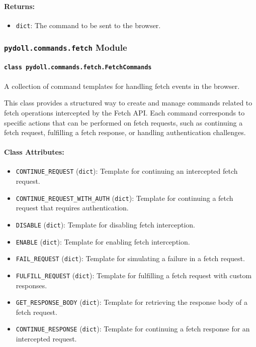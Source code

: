\documentclass{article}
\begin{document}
\paragraph{Returns:}
\begin{itemize}
    \item \texttt{dict}: The command to be sent to the browser.
\end{itemize}

\subsubsection*{\texttt{pydoll.commands.fetch} Module}

\paragraph*{\texttt{class pydoll.commands.fetch.FetchCommands}}
\noindent A collection of command templates for handling fetch events in the browser.

\noindent This class provides a structured way to create and manage commands related to fetch operations intercepted by the Fetch API\@. Each command corresponds to specific actions that can be performed on fetch requests, such as continuing a fetch request, fulfilling a fetch response, or handling authentication challenges.

\paragraph{Class Attributes:}
\begin{itemize}
    \item \texttt{CONTINUE\_REQUEST} (\texttt{dict}): Template for continuing an intercepted fetch request.
    \item \texttt{CONTINUE\_REQUEST\_WITH\_AUTH} (\texttt{dict}): Template for continuing a fetch request that requires authentication.
    \item \texttt{DISABLE} (\texttt{dict}): Template for disabling fetch interception.
    \item \texttt{ENABLE} (\texttt{dict}): Template for enabling fetch interception.
    \item \texttt{FAIL\_REQUEST} (\texttt{dict}): Template for simulating a failure in a fetch request.
    \item \texttt{FULFILL\_REQUEST} (\texttt{dict}): Template for fulfilling a fetch request with custom responses.
    \item \texttt{GET\_RESPONSE\_BODY} (\texttt{dict}): Template for retrieving the response body of a fetch request.
    \item \texttt{CONTINUE\_RESPONSE} (\texttt{dict}): Template for continuing a fetch response for an intercepted request.
\end{itemize}
\end{document}
